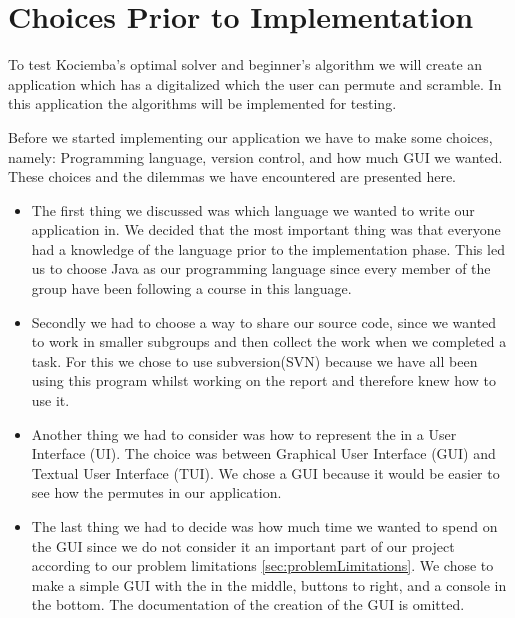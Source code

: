 \chapter{Choices Prior to Implementation}
\label{cha:choicesPriorToImplementation}

To test Kociemba's optimal solver and beginner's algorithm we will create an application which has a digitalized \rubik{} which the user can permute and scramble.
In this application the algorithms will be implemented for testing.

Before we started implementing our application we have to make some choices, namely: Programming language, version control, and how much GUI we wanted.
These choices and the dilemmas we have encountered are presented here.

\begin{itemize}
	\item The first thing we discussed was which language we wanted to write our application in.
We decided that the most important thing was that everyone had a knowledge of the language prior to the implementation phase.
This led us to choose Java as our programming language since every member of the group have been following a course in this language.

	\item Secondly we had to choose a way to share our source code, since we wanted to work in smaller subgroups and then collect the work when we completed a task.
For this we chose to use subversion(SVN) because we have all been using this program whilst working on the report and therefore knew how to use it.

	\item Another thing we had to consider was how to represent the \rubik{} in a User Interface (UI). The choice was between Graphical User Interface (GUI) and Textual User Interface (TUI). We chose a GUI because it would be easier to see how the \rubik{} permutes in our application.  
	\item The last thing we had to decide was how much time we wanted to spend on the GUI since we do not consider it an important part of our project according to our problem limitations \ref{sec:problemLimitations}.
We chose to make a simple GUI with the \rubik{} in the middle, buttons to right, and a console in the bottom.
The documentation of the creation of the GUI is omitted.
\end{itemize}
